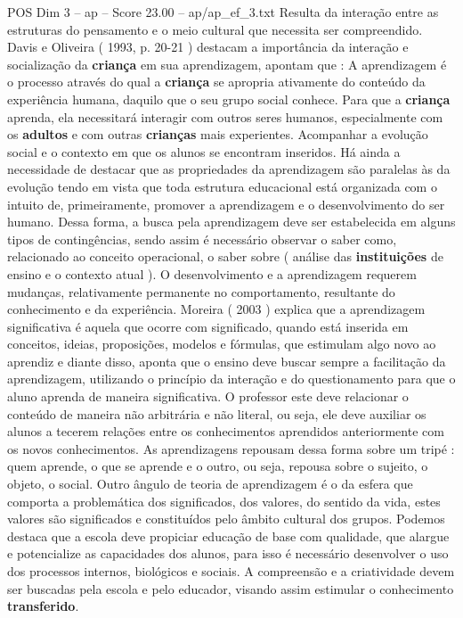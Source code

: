 \begin{textsample}{POS Dim 3 – ap – Score 23.00 – ap/ap\_ef\_3.txt}
Resulta da interação entre as estruturas do pensamento e o meio cultural que necessita ser compreendido.
Davis e Oliveira ( 1993, p. 20-21 ) destacam a importância da interação e socialização da \textbf{criança} em sua aprendizagem, apontam que : A aprendizagem é o processo através do qual a \textbf{criança} se apropria ativamente do conteúdo da experiência humana, daquilo que o seu grupo social conhece.
Para que a \textbf{criança} aprenda, ela necessitará interagir com outros seres humanos, especialmente com os \textbf{adultos} e com outras \textbf{crianças} mais experientes.
Acompanhar a evolução social e o contexto em que os alunos se encontram inseridos.
Há ainda a necessidade de destacar que as propriedades da aprendizagem são paralelas às da evolução tendo em vista que toda estrutura educacional está organizada com o intuito de, primeiramente, promover a aprendizagem e o desenvolvimento do ser humano.
Dessa forma, a busca pela aprendizagem deve ser estabelecida em alguns tipos de contingências, sendo assim é necessário observar o saber como, relacionado ao conceito operacional, o saber sobre ( análise das \textbf{instituições} de ensino e o contexto atual ).
O desenvolvimento e a aprendizagem requerem mudanças, relativamente permanente no comportamento, resultante do conhecimento e da experiência.
Moreira ( 2003 ) explica que a aprendizagem significativa é aquela que ocorre com significado, quando está inserida em conceitos, ideias, proposições, modelos e fórmulas, que estimulam algo novo ao aprendiz e diante disso, aponta que o ensino deve buscar sempre a facilitação da aprendizagem, utilizando o princípio da interação e do questionamento para que o aluno aprenda de maneira significativa.
O professor este deve relacionar o conteúdo de maneira não arbitrária e não literal, ou seja, ele deve auxiliar os alunos a tecerem relações entre os conhecimentos aprendidos anteriormente com os novos conhecimentos.
As aprendizagens repousam dessa forma sobre um tripé : quem aprende, o que se aprende e o outro, ou seja, repousa sobre o sujeito, o objeto, o social.
Outro ângulo de teoria de aprendizagem é o da esfera que comporta a problemática dos significados, dos valores, do sentido da vida, estes valores são significados e constituídos pelo âmbito cultural dos grupos.
Podemos destaca que a escola deve propiciar educação de base com qualidade, que alargue e potencialize as capacidades dos alunos, para isso é necessário desenvolver o uso dos processos internos, biológicos e sociais.
A compreensão e a criatividade devem ser buscadas pela escola e pelo educador, visando assim estimular o conhecimento \textbf{transferido}.

\end{textsample}
